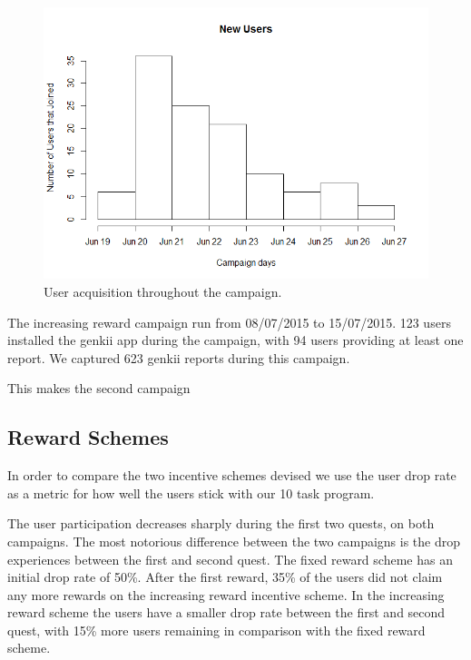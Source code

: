 \documentclass[letterpaper]{article}
\begin{document}
\begin{figure}[htb]
	\begin{center}
		\includegraphics[width=1\linewidth]{images/NewUsers}
		\caption{User acquisition throughout the campaign.\label{fig:newusers1}}
	\end{center}
\end{figure}


The increasing reward campaign run from 08/07/2015 to 15/07/2015.
123 users installed the genkii app during the campaign, with 94 users providing at least one report. We captured 623 genkii reports during this campaign.

This makes the second campaign 


\subsection{Reward Schemes}

In order to compare the two incentive schemes devised we use the user drop rate as a metric for how well the users stick with our 10 task program.

The user participation decreases sharply during the first two quests, on both campaigns.
The most notorious difference between the two campaigns is the drop experiences between the first and second quest. 
The fixed reward scheme has an initial drop rate of 50\%. After the first reward, 35\% of the users did not claim any more rewards on the increasing reward incentive scheme.  
In the increasing reward scheme the users have a smaller drop rate between the first and second quest, with 15\% more users remaining in comparison with the fixed reward scheme.
\end{document}
